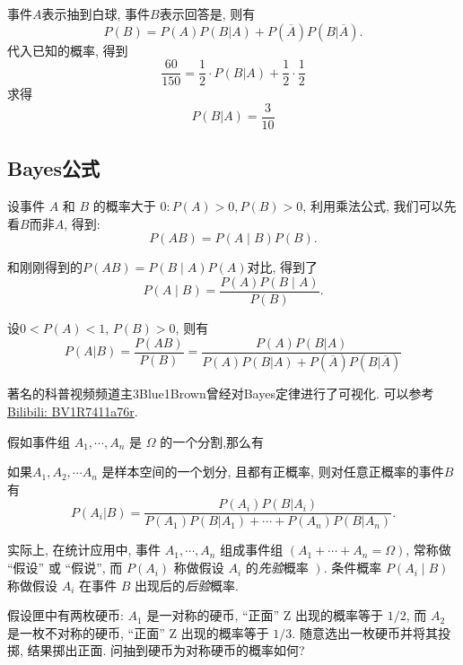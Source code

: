 \begin{solution}
    事件$A$表示抽到白球, 事件$B$表示回答是, 则有
    $$P(B)=P(A)P(B|A)+P(\overline{A})P(B|\overline{A}).$$
    代入已知的概率, 得到
    $$\frac{60}{150}=\frac12\cdot P(B|A)+\frac12\cdot\frac12 $$
    求得
    $$P(B|A)=\frac{3}{10}$$
\end{solution}

\subsection{Bayes公式}
设事件 $A$ 和 $B$ 的概率大于 $0: P(A)>0, P(B)>0$, 利用乘法公式, 我们可以先看$B$而非$A$, 得到: 
$$P(A B)=P(A \mid B) P(B).$$

和刚刚得到的$P(A B)=P(B \mid A) P(A)$对比, 得到了$$P(A \mid B)=\frac{P(A) P(B \mid A)}{P(B)}.$$

\begin{theorem}[Bayes定理]
    设$0<P(A)<1$, $P(B)>0$, 则有
    $$P(A|B)=\frac{ P(AB)}{ P(B)}
        =\frac{P(A) P(B|A)}{P(A) P(B|A)+P(\overline{A})P(B|\overline{A})}$$
\end{theorem}

\begin{webaside}
    著名的科普视频频道主3Blue1Brown曾经对Bayes定律进行了可视化. 可以参考\href{https://www.bilibili.com/video/BV1R7411a76r}{Bilibili: BV1R7411a76r}.
\end{webaside}
假如事件组 $A_1, \cdots, A_n$ 是 $\Omega$ 的一个分割,那么有

\begin{corollary}
    如果$A_1, A_2, \cdots A_n$ 是样本空间的一个划分, 且都有正概率, 则对任意正概率的事件$B$有
    \[
        P(A_i|B)=\frac{P(A_i)P(B|A_i)}{P(A_1)P(B|A_1)+\cdots+P(A_n)P(B|A_n)}.%
    \]
\end{corollary}

    实际上, 在统计应用中, 事件 $A_1, \cdots, A_n$ 组成事件组 $\left(A_1+\cdots+A_n=\Omega\right)$, 常称做 ``假设'' 或 ``假说'', 而 $P\left(A_i\right)$ 称做假设 $A_i$ 的\emph{先验}概率 $\left.\right)$. 条件概率 $P\left(A_i \mid B\right)$ 称做假设 $A_i$ 在事件 $B$ 出现后的\emph{后验}概率. 


\begin{exercise}
    假设匣中有两枚硬币: $A_1$ 是一对称的硬币, ``正面'' $\mathrm{Z}$ 出现的概率等于 $1 / 2$, 而 $A_2$ 是一枚不对称的硬币, ``正面'' $\mathrm{Z}$ 出现的概率等于 $1 / 3$. 随意选出一枚硬币并将其投掷, 结果掷出正面. 问抽到硬币为对称硬币的概率如何?
\end{exercise}

